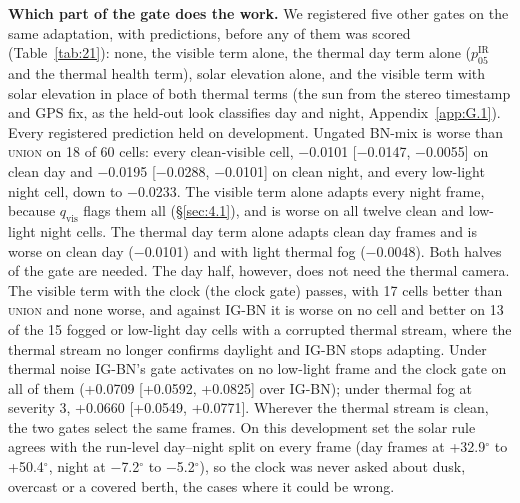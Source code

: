 \documentclass[10pt]{article}
\begin{document}
\textbf{Which part of the gate does the work.} We registered five other gates on the same adaptation, with predictions, before any of them was scored (Table~\ref{tab:21}): none, the visible term alone, the thermal day term alone ($p_{05}^{\mathrm{IR}}$ and the thermal health term), solar elevation alone, and the visible term with solar elevation in place of both thermal terms (the sun from the stereo timestamp and GPS fix, as the held-out look classifies day and night, Appendix~\ref{app:G.1}). Every registered prediction held on development. Ungated BN-mix is worse than \textsc{union} on 18 of 60 cells: every clean-visible cell, $-$0.0101 [$-$0.0147, $-$0.0055] on clean day and $-$0.0195 [$-$0.0288, $-$0.0101] on clean night, and every low-light night cell, down to $-$0.0233. The visible term alone adapts every night frame, because $q_{\mathrm{vis}}$ flags them all (\S\ref{sec:4.1}), and is worse on all twelve clean and low-light night cells. The thermal day term alone adapts clean day frames and is worse on clean day ($-$0.0101) and with light thermal fog ($-$0.0048). Both halves of the gate are needed. The day half, however, does not need the thermal camera. The visible term with the clock (the clock gate) passes, with 17 cells better than \textsc{union} and none worse, and against IG-BN it is worse on no cell and better on 13 of the 15 fogged or low-light day cells with a corrupted thermal stream, where the thermal stream no longer confirms daylight and IG-BN stops adapting. Under thermal noise IG-BN's gate activates on no low-light frame and the clock gate on all of them (+0.0709 [+0.0592, +0.0825] over IG-BN); under thermal fog at severity 3, +0.0660 [+0.0549, +0.0771]. Wherever the thermal stream is clean, the two gates select the same frames. On this development set the solar rule agrees with the run-level day--night split on every frame (day frames at +32.9$^{\circ}$ to +50.4$^{\circ}$, night at $-$7.2$^{\circ}$ to $-$5.2$^{\circ}$), so the clock was never asked about dusk, overcast or a covered berth, the cases where it could be wrong.
\end{document}
